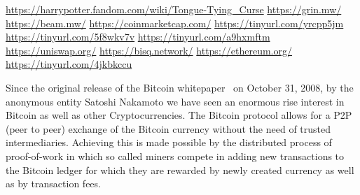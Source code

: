 \urldef\urlharrypotter\url{https://harrypotter.fandom.com/wiki/Tongue-Tying_Curse}
\urldef\urlgrin\url{https://grin.mw/}
\urldef\urlbeam\url{https://beam.mw/}
\urldef{\urlcoinmkt}\url{https://coinmarketcap.com/}
\urldef{\urlmtgox}\url{https://tinyurl.com/yrcpp5jm}
\urldef{\urlbitgrail}\url{https://tinyurl.com/5f8wkv7v}
\urldef{\urlquadriga}\url{https://tinyurl.com/a9hxmftm}
\urldef{\urluniswp}\url{https://uniswap.org/}
\urldef{\urlbisq}\url{https://bisq.network/}
\urldef{\urlethereum}\url{https://ethereum.org/}
\urldef{\urlgrinfund}\url{https://tinyurl.com/4jkbkccu}

Since the original release of the Bitcoin whitepaper~\cite{nakamoto2019bitcoin} on October 31, 2008, by the anonymous entity Satoshi Nakamoto we have seen an enormous rise interest in Bitcoin as well as other Cryptocurrencies.
The Bitcoin protocol allows for a P2P (peer to peer) exchange of the Bitcoin currency without the need of trusted intermediaries.
Achieving this is made possible by the distributed process of proof-of-work in which so called miners compete in adding new transactions to the Bitcoin ledger for which they are rewarded by newly created currency as well as by transaction fees.

